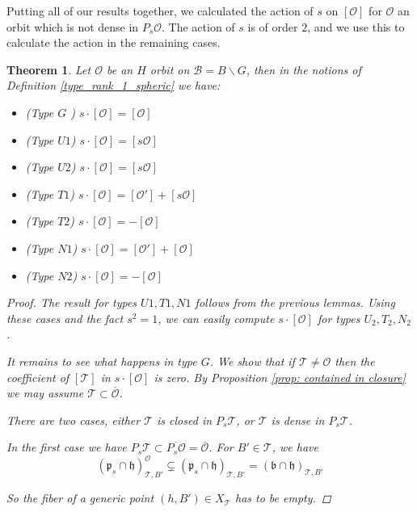 \documentclass[12pt]{article}
\newcommand{\B}{\mathcal{B}}
\newcommand{\s}{\mathcal{O}}
\theoremstyle{plain}
\newtheorem{theorem}{Theorem}[section]
\theoremstyle{definition}
\begin{document}
Putting all of our results together, we calculated the action of ${s}$ on $[\mathcal{O}]$ for $\s$ an orbit which is not dense in $P_{s}\mathcal{O}$. The action of ${s}$ is of order $2$, and we use this to calculate the action in the remaining cases.
\begin{theorem}\label{computation result}
    Let $\mathcal{O}$ be an $H$ orbit on $\B=B\backslash G$, then in the notions of Definition \ref{type_rank_1_spheric} we have:

    \begin{itemize}
        \item (Type $G$ ) $s \cdot [\mathcal{O}]=[\mathcal{O}]$
        \item (Type $U1$) $s \cdot [\mathcal{O}]=[s\mathcal{O}]$
        \item (Type $U2$) $s \cdot [\mathcal{O}]=[s\mathcal{O}]$
        \item (Type $T1$) $s \cdot [\mathcal{O}]=[\mathcal{O}']+[s\mathcal{O}]$
        \item (Type $T2$) $s \cdot [\mathcal{O}]=-[\mathcal{O}]$
        \item (Type $N1$) $s \cdot [\mathcal{O}]=[\mathcal{O}']+[\mathcal{O}]$
        \item (Type $N2$) $s \cdot [\mathcal{O}]=-[\mathcal{O}]$

    \end{itemize}

    \begin{proof}
        The result for types $U1,T1,N1$ follows from the previous lemmas. Using these cases and the fact $s^2=1$, we can easily compute $s \cdot [\mathcal{O}]$ for types $U_{2},T_{2},N_{2}$.

        It remains to see what happens in type $G$. We show that if $\mathcal{T}\neq \s$ then the coefficient of $[\mathcal{T}]$ in $s\cdot [\s]$ is zero. By Proposition \ref{prop: contained in closure} we may assume $\mathcal{T}\subset \overline{\s}$.
        
        There are two cases, either $\mathcal{T}$ is closed in $P_s\mathcal{T}$, or $\mathcal{T}$ is dense in $P_s\mathcal{T}$. 
        
        In the first case we have $P_s\mathcal{T}\subset \overline{P_s\s}=\overline{\s}$. For $B'\in \mathcal{T}$, we have $$(\mathfrak{p}_s\cap \mathfrak{h})^\s_{\mathcal{T},B'}\subsetneq(\mathfrak{p}_s\cap \mathfrak{h})_{\mathcal{T},B'}=(\mathfrak{b}\cap \mathfrak{h})_{\mathcal{T},B'}$$
        
        So the fiber of a generic point $(h,B')\in X_\mathcal{T}$ has to be empty. 


\end{proof}
\end{theorem}
\end{document}
